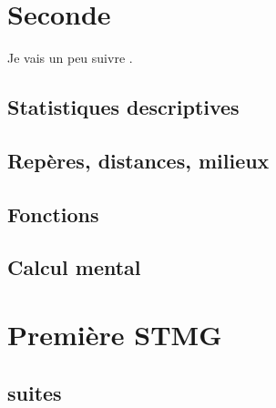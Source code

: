 




\makeindex
\makenomenclature







\newpage



\tableofcontents

\newpage

\part{Seconde}

Je vais un peu suivre \cite{oklaEg}.

\chapter{Statistiques descriptives}




\chapter{Repères, distances, milieux}


\chapter{Fonctions}


\chapter{Calcul mental}


\part{Première STMG}

\chapter{suites}



